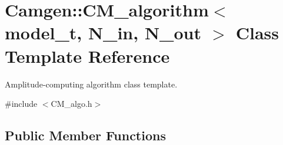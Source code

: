 \hypertarget{a00070}{\section{Camgen\-:\-:C\-M\-\_\-algorithm$<$ model\-\_\-t, N\-\_\-in, N\-\_\-out $>$ Class Template Reference}
\label{a00070}
}


Amplitude-\/computing algorithm class template.  




{\ttfamily \#include $<$C\-M\-\_\-algo.\-h$>$}

\subsection*{Public Member Functions}
